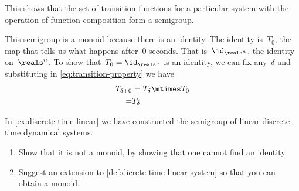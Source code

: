 \begin{example}
    This shows that the set of transition functions for a particular system with the operation of function composition form a semigroup.

    This semigroup is a monoid because there is an identity. The identity is~$T_0$, the map that tells us
    what happens after~$0$ seconds. That is~$\id_{\reals^n}$, the identity on~$\reals^n$.
    To show that~$T_0 = \id_{\reals^n}$ is an identity, we can fix any~$\delta$ and substituting in \cref{eq:transition-property} we have
    \begin{equation*}
        \begin{aligned}
            T_{\delta + 0}&= T_{\delta} \mtimes T_{0} \\
            = & T_{\delta}
        \end{aligned}
    \end{equation*}

\end{example}


\begin{exercise}
    In \cref{ex:discrete-time-linear} we have constructed the semigroup of linear discrete-time dynamical systems.

    \begin{enumerate}
        \item Show that it is not a monoid, by showing that one cannot find an identity.
        \item Suggest an extension to \cref{def:dicrete-time-linear-system} so that you can obtain a monoid.
    \end{enumerate}
\end{exercise}
\begin{solution}
\end{solution}

